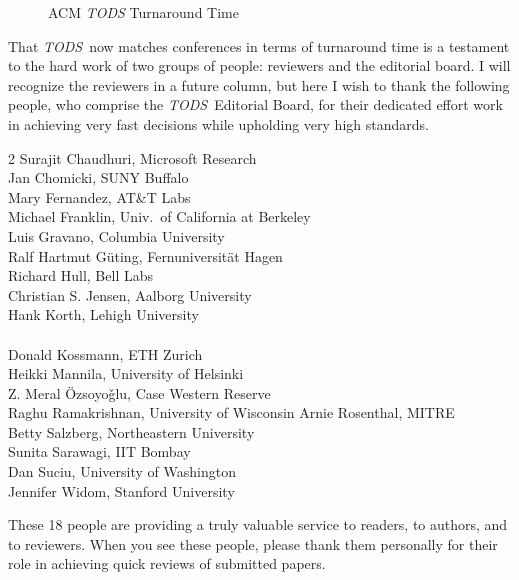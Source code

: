 \documentclass[11pt]{article}
\newcommand{\tods}{{\em TODS\/}}
\begin{document}
\begin{figure}[t]
\begin{center}
\end{center}
\caption{ACM {\em TODS} Turnaround Time\label{fig:turnaround}}
\end{figure}

That \tods\ now matches conferences in terms of turnaround time is a
testament to the hard work of two groups of people: reviewers and the
editorial board. I will recognize the reviewers in a future column, but here
I wish to thank the following people, who comprise the \tods\ Editorial
Board, for their dedicated effort work in achieving very fast decisions
while upholding very high standards.

\vspace{4ex}

\begin{multicols}{2}
\noindent
Surajit Chaudhuri, Microsoft Research\\
Jan Chomicki, SUNY Buffalo\\
Mary Fernandez, AT\&T Labs\\
Michael Franklin, Univ.~of California at Berkeley\\
Luis Gravano, Columbia University\\
Ralf Hartmut G\"{u}ting, Fernuniversit\"{a}t Hagen\\
Richard Hull, Bell Labs\\
Christian S. Jensen, Aalborg University\\
Hank Korth, Lehigh University\\
\\
Donald Kossmann, ETH Zurich\\
Heikki Mannila, University of Helsinki\\
Z. Meral \"Ozsoyo\v{g}lu, Case Western Reserve\\
Raghu Ramakrishnan, University of Wisconsin
Arnie Rosenthal, MITRE\\
Betty Salzberg, Northeastern University\\
Sunita Sarawagi, IIT Bombay\\
Dan Suciu, University of Washington\\
Jennifer Widom, Stanford University\\
\end{multicols}

\noindent
These 18 people are providing a truly valuable service to readers, to
authors, and to reviewers. When you see these people, please thank them
personally for their role in achieving quick reviews of submitted papers.
\end{document}

